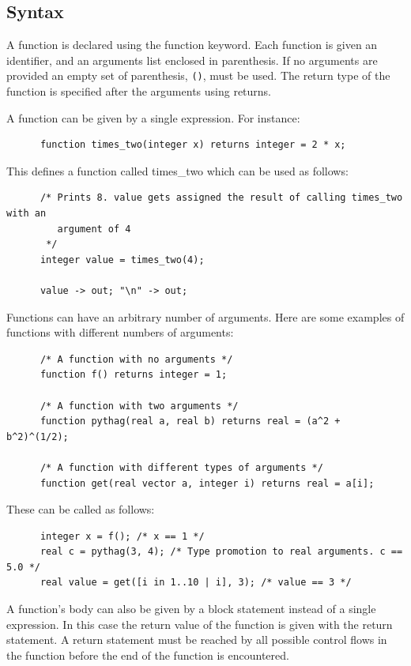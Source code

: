 \documentclass{article}
\begin{document}
  \subsection{Syntax}

    A function is declared using the function keyword. Each function is given an identifier, and an arguments list
    enclosed in parenthesis. If no arguments are provided an empty set of parenthesis, \texttt{()}, must be used.
    The return type of the function is specified after the arguments using returns.

    A function can be given by a single expression. For instance:

    \begin{lstlisting}
      function times_two(integer x) returns integer = 2 * x;
    \end{lstlisting}

    This defines a function called times\_two which can be used as follows:

    \begin{lstlisting}
      /* Prints 8. value gets assigned the result of calling times_two with an
         argument of 4
       */
      integer value = times_two(4);

      value -> out; "\n" -> out;
    \end{lstlisting}

    Functions can have an arbitrary number of arguments. Here are some examples of functions with different numbers
    of arguments:

    \begin{lstlisting}
      /* A function with no arguments */
      function f() returns integer = 1;

      /* A function with two arguments */
      function pythag(real a, real b) returns real = (a^2 + b^2)^(1/2);

      /* A function with different types of arguments */
      function get(real vector a, integer i) returns real = a[i];
    \end{lstlisting}

    These can be called as follows:

    \begin{lstlisting}
      integer x = f(); /* x == 1 */
      real c = pythag(3, 4); /* Type promotion to real arguments. c == 5.0 */
      real value = get([i in 1..10 | i], 3); /* value == 3 */
    \end{lstlisting}

    A function's body can also be given by a block statement instead of a single expression. In this case the return
    value of the function is given with the return statement. A return statement must be reached by all possible
    control flows in the function before the end of the function is encountered.
\end{document}
